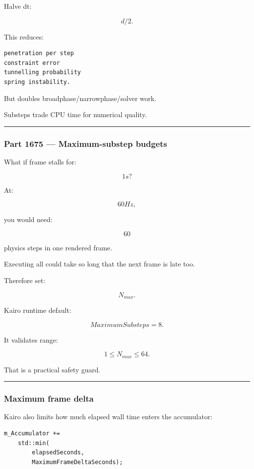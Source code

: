 Halve dt:

\[
d/2.
\]

This reduces:

\begin{verbatim}
penetration per step
constraint error
tunnelling probability
spring instability.
\end{verbatim}

But doubles broadphase/narrowphase/solver work.

Substeps trade CPU time for numerical quality.

\begin{center}\rule{0.5\linewidth}{0.5pt}\end{center}

\subsubsection{Part 1675 --- Maximum-substep budgets}\label{part-1675-maximum-substep-budgets}

What if frame stalls for:

\[
1s?
\]

At:

\[
60Hz,
\]

you would need:

\[
60
\]

physics steps in one rendered frame.

Executing all could take so long that the next frame is late too.

Therefore set:

\[
N_{max}.
\]

Kairo runtime default:

\[
\boxed{
MaximumSubsteps=8.
}
\]

It validates range:

\[
1\le N_{max}\le64.
\]

That is a practical safety guard.

\begin{center}\rule{0.5\linewidth}{0.5pt}\end{center}

\subsubsection{Maximum frame delta}\label{maximum-frame-delta}

Kairo also limits how much elapsed wall time enters the accumulator:

\begin{verbatim}
m_Accumulator +=
    std::min(
        elapsedSeconds,
        MaximumFrameDeltaSeconds);
\end{verbatim}

